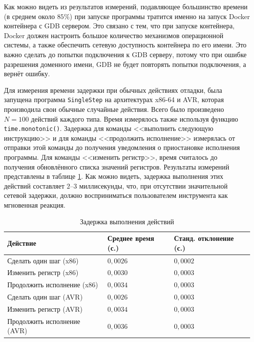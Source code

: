 \documentclass[a4paper,article,14pt]{extarticle}
\begin{document}
Как можно видеть из результатов измерений, подавляющее большинство времени (в среднем около $85\%$) при запуске программы тратится именно на запуск Docker контейнера с GDB сервером. Это связано с тем, что при запуске контейнера, Docker должен настроить большое количество механизмов операционной системы, а также обеспечить сетевую доступность контейнера по его имени. Это важно сделать до попытки подключения к GDB серверу, потому что при ошибке разрешения доменного имени, GDB не будет повторять попытки подключения, а вернёт ошибку.

Для измерения времени задержки при обычных действиях отладки, была запущена программа \texttt{SingleStep} на архитектурах x86-64 и AVR, которая производила свои обычные случайные действия. Всего было произведено $N = 100$ действий каждого типа. Время измерялось также используя функцию \texttt{time.monotonic()}. Задержка для команды <<выполнить следующую инструкцию>> и для команды <<продолжить исполнение>> измерялась от отправки этой команды до получения уведомления о приостановке исполнения программы. Для команды <<изменить регистр>>, время считалось до получения обновлённого списка значений регистров. Результаты измерений представлены в таблице \ref{table:actiondelay}. Как можно видеть, задержка выполнения этих действий составляет $2$--$3$ миллисекунды, что, при отсутствии значительной сетевой задержки, должно восприниматься пользователем инструмента как мгновенная реакция.

\begin{table}[ht]
\small
    \begin{tabular}{p{6cm}p{4.5cm}p{4.5cm}}
    \toprule
    Действие & Среднее время (с.)  & Станд. отклонение (с.) \\
    \midrule
Сделать один шаг (x86) & $0{,}0026$ & $0{,}0002$ \\
Изменить регистр (x86) & $0{,}0030$ & $0{,}0003$ \\
Продолжить исполнение (x86) & $0{,}0034$ & $0{,}0003$ \\
Сделать один шаг (AVR) & $0{,}0026$ & $0{,}0003$ \\
Изменить регистр (AVR) & $0{,}0034$ & $0{,}0003$ \\
Продолжить исполнение (AVR) & $0{,}0036$ & $0{,}0003$ \\
\bottomrule
    \end{tabular}
\caption{\label{table:actiondelay}Задержка выполнения действий}
\normalsize
\end{table}
\end{document}
